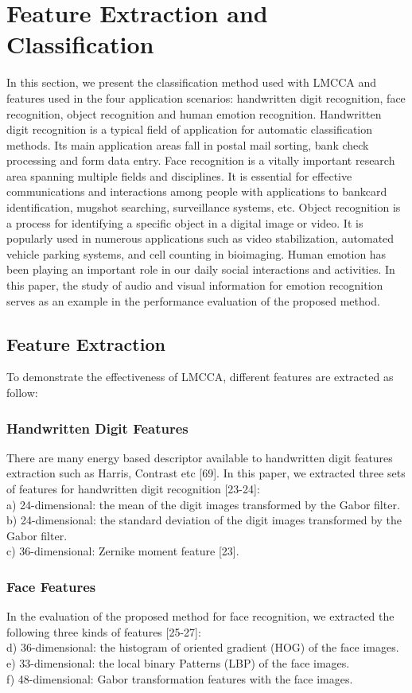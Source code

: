 \documentclass[journal]{IEEEtran}
\begin{document}
\section{Feature Extraction and Classification}
In this section, we present the classification method used with LMCCA and features used in the four application scenarios: handwritten digit recognition, face recognition, object recognition and human emotion recognition. Handwritten digit recognition is a typical field of application for automatic classification methods. Its main application areas fall in postal mail sorting, bank check processing and form data entry. Face recognition is a vitally important research area spanning multiple fields and disciplines. It is essential for effective communications and interactions among people with applications to bankcard identification, mugshot searching, surveillance systems, etc. Object recognition is a process for identifying a specific object in a digital image or video. It is popularly used in numerous applications such as video stabilization, automated vehicle parking systems, and cell counting in bioimaging. Human emotion has been playing an important role in our daily social interactions and activities. In this paper, the study of audio and visual information for emotion recognition serves as an example in the performance evaluation of the proposed method.\\
\subsection{Feature Extraction}
To demonstrate the effectiveness of LMCCA, different features are extracted as follow:
\subsubsection{Handwritten Digit Features}
There are many energy based descriptor available to handwritten digit features extraction such as Harris, Contrast etc [69]. In this paper, we extracted three sets of features for handwritten digit recognition [23-24]:\\
a) 24-dimensional: the mean of the digit images transformed by the Gabor filter.\\
b) 24-dimensional: the standard deviation of the digit images transformed by the Gabor filter.\\
c) 36-dimensional: Zernike moment feature [23].
\subsubsection{Face Features}
In the evaluation of the proposed method for face recognition, we extracted the following three kinds of features [25-27]:\\
d) 36-dimensional: the histogram of oriented gradient (HOG) of the face images.\\
e) 33-dimensional: the local binary Patterns (LBP) of the face images.\\
f) 48-dimensional: Gabor transformation features with the face images.
\end{document}
